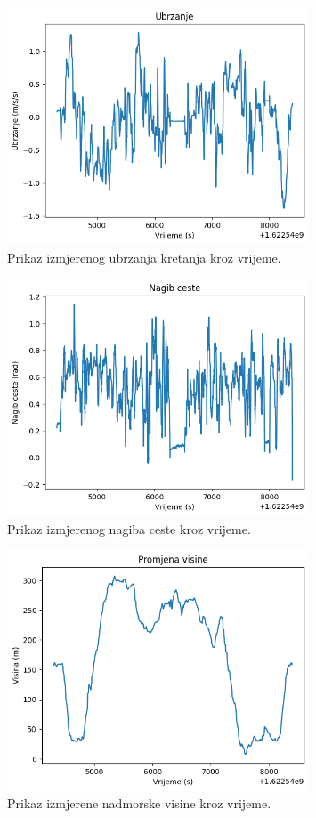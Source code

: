 \begin{figure}
    \centering
    \includegraphics[width=0.8\textwidth]{images/acceleration.png}
    \caption{Prikaz izmjerenog ubrzanja kretanja kroz vrijeme.}
    \label{fig:a:acceleration}
\end{figure}

\begin{figure}
    \centering
    \includegraphics[width=0.8\textwidth]{images/road_angle.png}
    \caption{Prikaz izmjerenog nagiba ceste kroz vrijeme.}
    \label{fig:a:road_angle}
\end{figure}

\begin{figure}
    \centering
    \includegraphics[width=0.8\textwidth]{images/height.png}
    \caption{Prikaz izmjerene nadmorske visine kroz vrijeme.}
    \label{fig:a:height}
\end{figure}

